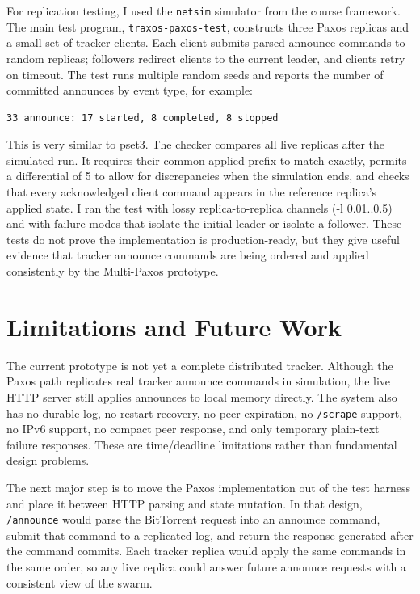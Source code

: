 \documentclass[letterpaper,twocolumn,10pt]{article}
\begin{document}
For replication testing, I used the \texttt{netsim} simulator from the
course framework. The main test program, \texttt{traxos-paxos-test},
constructs three Paxos replicas and a small set of tracker clients. Each
client submits parsed announce commands to random replicas; followers
redirect clients to the current leader, and clients retry on timeout. The
test runs multiple random seeds and reports the number of committed
announces by event type, for example:

\begin{verbatim}
33 announce: 17 started, 8 completed, 8 stopped
\end{verbatim}

\noindent
This is very similar to pset3. The checker compares all live replicas after the
simulated run. It requires their common applied prefix to match exactly,
permits a differential of 5 to allow for discrepancies when the simulation
ends, and checks that every acknowledged client command appears in the
reference replica's applied state. I ran the test with lossy replica-to-replica
channels (-l 0.01..0.5) and with failure modes that isolate the initial leader or isolate a
follower. These tests do not prove the implementation is production-ready, but
they give useful evidence that tracker announce commands are being ordered and
applied consistently by the Multi-Paxos prototype.

\section{Limitations and Future Work}

The current prototype is not yet a complete distributed tracker. Although
the Paxos path replicates real tracker announce commands in simulation,
the live HTTP server still applies announces to local memory directly. The
system also has no durable log, no restart recovery, no peer expiration, no
\texttt{/scrape} support, no IPv6 support, no compact peer response, and
only temporary plain-text failure responses. These are time/deadline
limitations rather than fundamental design problems.

The next major step is to move the Paxos implementation out of the test
harness and place it between HTTP parsing and state mutation. In that
design, \texttt{/announce} would parse the BitTorrent request into an
announce command, submit that command to a replicated log, and return the
response generated after the command commits. Each tracker replica would
apply the same commands in the same order, so any live replica could answer
future announce requests with a consistent view of the swarm.
\end{document}
